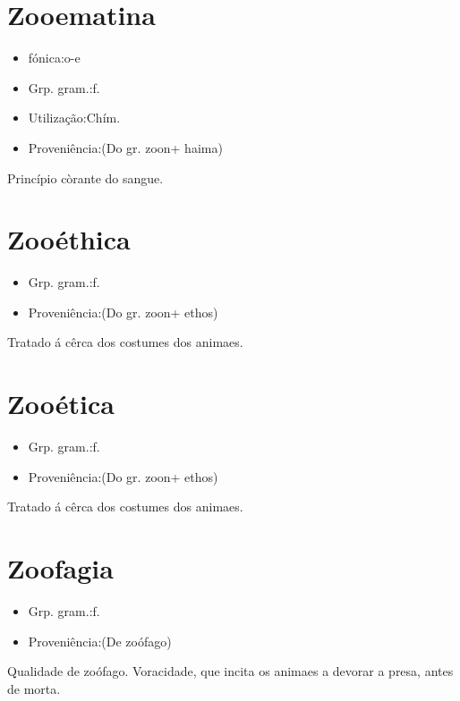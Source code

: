 \section{Zooematina}
\begin{itemize}
\item {fónica:o-e}
\end{itemize}
\begin{itemize}
\item {Grp. gram.:f.}
\end{itemize}
\begin{itemize}
\item {Utilização:Chím.}
\end{itemize}
\begin{itemize}
\item {Proveniência:(Do gr. \textunderscore zoon\textunderscore  + \textunderscore haima\textunderscore )}
\end{itemize}
Princípio còrante do sangue.
\section{Zooéthica}
\begin{itemize}
\item {Grp. gram.:f.}
\end{itemize}
\begin{itemize}
\item {Proveniência:(Do gr. \textunderscore zoon\textunderscore  + \textunderscore ethos\textunderscore )}
\end{itemize}
Tratado á cêrca dos costumes dos animaes.
\section{Zooética}
\begin{itemize}
\item {Grp. gram.:f.}
\end{itemize}
\begin{itemize}
\item {Proveniência:(Do gr. \textunderscore zoon\textunderscore  + \textunderscore ethos\textunderscore )}
\end{itemize}
Tratado á cêrca dos costumes dos animaes.
\section{Zoofagia}
\begin{itemize}
\item {Grp. gram.:f.}
\end{itemize}
\begin{itemize}
\item {Proveniência:(De \textunderscore zoófago\textunderscore )}
\end{itemize}
Qualidade de zoófago.
Voracidade, que incita os animaes a devorar a presa, antes de morta.
